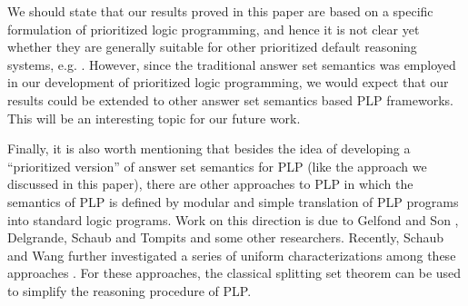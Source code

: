 \documentclass{tlp}
\begin{document}

We should state that
our results proved in this paper 
are based on a specific formulation of prioritized logic programming, and hence
it is not clear yet whether they are generally suitable for other prioritized 
default reasoning systems, e.g. \cite{d:plp,g:97,w:plp}. 
However, since the traditional
answer set semantics was employed in our development of 
prioritized logic programming, we would expect that our results could be extended 
to other answer set semantics based PLP frameworks. This will be
an interesting topic for our future work.

Finally, 
it is also worth mentioning that besides the idea of developing
a ``prioritized version'' of answer set semantics for PLP (like the approach 
we discussed in this paper),
there are other approaches to PLP
in which the semantics of PLP is defined by 
modular and simple translation of PLP programs into standard logic
programs. Work on this direction is due to 
Gelfond and Son \cite{ms:98}, Delgrande, Schaub and Tompits \cite{d:plp} and
some other researchers. Recently, Schaub and Wang
further investigated a series of uniform characterizations among these
approaches \cite{sw:01}. For these approaches, the classical splitting
set theorem \cite{lt:lp94} can be used to simplify the reasoning 
procedure of PLP.





\end{document}
